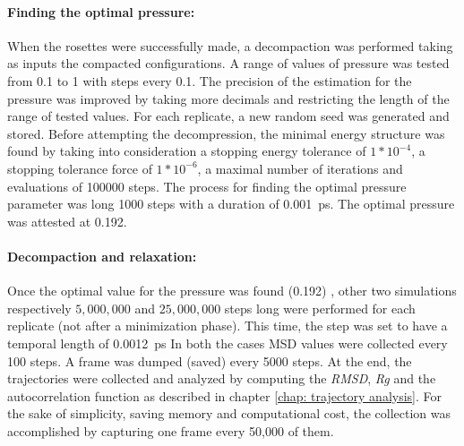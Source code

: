 \paragraph{Finding the optimal pressure:} \label{parag: optimal pressure}

When the rosettes were successfully made, a decompaction was performed taking as inputs the compacted configurations. A range of values of pressure was tested from 0.1 to 1 with steps every 0.1. The precision of the estimation for the pressure was improved by taking more decimals and restricting the length of the range of tested values. For each replicate, a new random seed was generated and stored.
Before attempting the decompression, the minimal energy structure was found by taking into consideration a stopping energy tolerance of $1*10^{-4}$, a stopping tolerance force of $1*10^{-6}$, a maximal number of iterations and evaluations of 100000 steps. %
The process for finding the optimal pressure parameter was long 1000 steps with a duration of \SI{0.001}{\pico\second}.
The optimal pressure was attested at 0.192. %





\paragraph{Decompaction and relaxation:}

Once the optimal value for the pressure was found (0.192) %
, other two simulations respectively $5,000,000$ and $25,000,000$ steps long were performed for each replicate (not after a minimization phase). This time, the step was set to have a temporal length of \SI{0.0012}{\pico\second} In both the cases MSD values were collected every 100 steps. A frame was dumped (saved) every 5000 steps. At the end, the trajectories were collected and analyzed by computing the \textit{RMSD}, \textit{Rg} and the autocorrelation function as described in chapter \ref{chap: trajectory analysis}. For the sake of simplicity, saving memory and computational cost, the collection was accomplished by capturing one frame every 50,000 of them.

